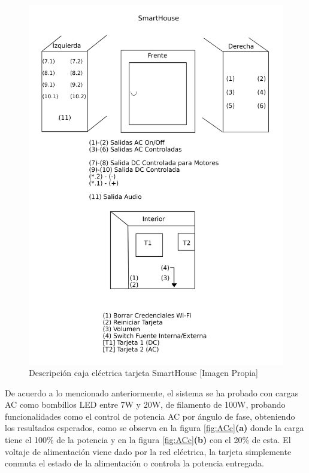 \begin{figure}
	\centering
	\caption{Descripción caja eléctrica tarjeta SmartHouse [Imagen Propia]}
	\label{fig:labels}
	\includegraphics[width=0.7\linewidth]{Imagenes/labels}
\end{figure}


De acuerdo a lo mencionado anteriormente, el sistema se ha probado con cargas AC como bombillos LED entre 7W y 20W, de filamento de 100W, probando funcionalidades como el control de potencia AC por ángulo de fase, obteniendo los resultados esperados, como se observa en la figura \ref{fig:ACc}\textbf{(a)} donde la carga tiene el 100\% de la potencia y en la figura \ref{fig:ACc}\textbf{(b)} con el 20\% de esta. El voltaje de alimentación viene dado por la red eléctrica, la tarjeta simplemente conmuta el estado de la alimentación o controla la potencia entregada. 

